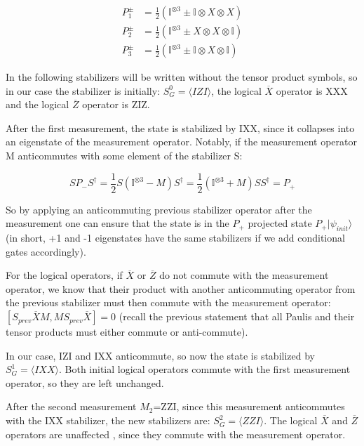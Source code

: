 \begin{align}
	P^{\pm}_{1} &= \frac{1}{2}\left(\mathbb{I}^{\otimes 3} \pm 
	\mathbb{I}\otimes X \otimes X\right) \\
	P^{\pm}_{2} & = \frac{1}{2} \left(\mathbb{I}^{\otimes 3} \pm
	X \otimes X \otimes \mathbb{I}\right) \\
	P^{\pm}_{3} &= \frac{1}{2} \left(\mathbb{I}^{\otimes 3} \pm
	\mathbb{I} \otimes X \otimes \mathbb{I}\right)
\end{align}

In the following stabilizers
will be written without the tensor product symbols, so in 
our case the stabilizer is initially: $S_{G}^{0}= \langle IZI \rangle$,
the logical $\overline{X}$ operator is XXX and the logical
$\overline{Z}$ operator is ZIZ.

After the first measurement, the state is stabilized by 
IXX, since it collapses into an eigenstate of the measurement 
operator. Notably, if the measurement operator M anticommutes
with some element of the stabilizer S:

\begin{equation}
	SP_{-}S^{\dagger} = \frac{1}{2}S\left( 
	\mathbb{I}^{\otimes 3} - M \right) S^{\dagger}
	= \frac{1}{2} \left( \mathbb{I}^{\otimes 3} + M \right)
	SS^{\dagger} = P_{+}
\end{equation}

So by applying an anticommuting previous stabilizer operator
after the measurement one can ensure that the state is in the
$P_{+}$ projected state $P_{+}|\psi_{init}\rangle$ (in short,
+1 and -1 eigenstates have the same stabilizers if we add 
conditional gates accordingly).

For the logical operators, if $\overline{X}$ or $\overline{Z}$
do not commute with the measurement operator, we know that their
product with another anticommuting operator from the previous
stabilizer must then commute with the measurement operator: 
$[S_{prev}\overline{X}M, MS_{prev}\overline{X}]=0$ (recall the
previous statement that all Paulis and their tensor products must
either commute or anti-commute).

In our case, IZI and IXX anticommute,
so now the state is stabilized by $S^{1}_{G} = \langle IXX
\rangle$. Both initial logical operators commute with the first
measurement operator, so they are left unchanged.

After the second measurement $M_{2}$=ZZI, since this
measurement anticommutes with the IXX stabilizer, the new 
stabilizers are: $S^{2}_{G}=\langle ZZI \rangle$. The logical 
$\overline{X}$ and $\overline{Z}$ operators are unaffected
, since they commute with the measurement operator.

